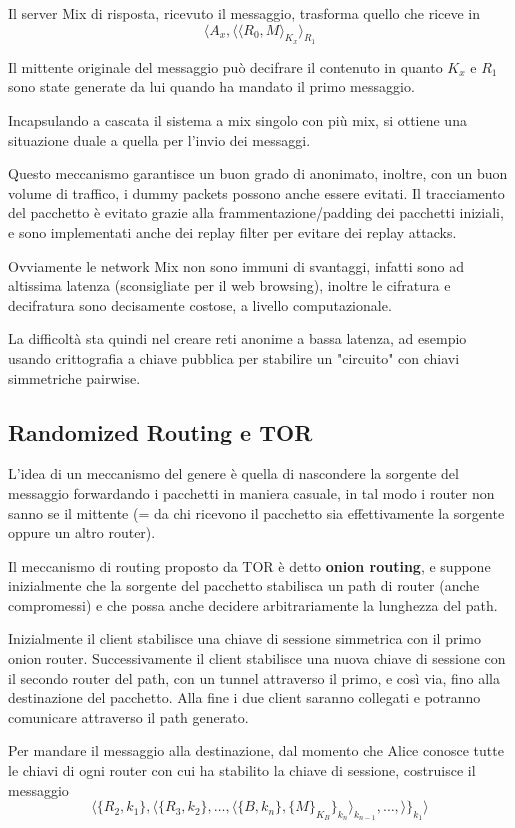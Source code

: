 \documentclass[a4paper, 10pt, twoside]{article}
\begin{document}
	Il server Mix di risposta, ricevuto il messaggio, trasforma quello che riceve in \[\langle A_x,\langle\langle R_0, M\rangle_{K_x}\rangle_{R_1}\]

	Il mittente originale del messaggio può decifrare il contenuto in quanto $K_x$ e $R_1$ sono state generate da lui quando ha mandato il primo messaggio.

	Incapsulando a cascata il sistema a mix singolo con più mix, si ottiene una situazione duale a quella per l'invio dei messaggi.

	Questo meccanismo garantisce un buon grado di anonimato, inoltre, con un buon volume di traffico, i dummy packets possono anche essere evitati. Il tracciamento del pacchetto è evitato grazie alla frammentazione/padding dei pacchetti iniziali, e sono implementati anche dei replay filter per evitare dei replay attacks.

	Ovviamente le network Mix non sono immuni di svantaggi, infatti sono ad altissima latenza (sconsigliate per il web browsing), inoltre le cifratura e decifratura sono decisamente costose, a livello computazionale.

	La difficoltà sta quindi nel creare reti anonime a bassa latenza, ad esempio usando crittografia a chiave pubblica per stabilire un "circuito" con chiavi simmetriche pairwise.

	\subsection{Randomized Routing e TOR}
	L'idea di un meccanismo del genere è quella di nascondere la sorgente del messaggio forwardando i pacchetti in maniera casuale, in tal modo i router non sanno se il mittente (= da chi ricevono il pacchetto sia effettivamente la sorgente oppure un altro router).

	Il meccanismo di routing proposto da TOR è detto \textbf{onion routing}, e suppone inizialmente che la sorgente del pacchetto stabilisca un path di router (anche compromessi) e che possa anche decidere arbitrariamente la lunghezza del path.

	Inizialmente il client stabilisce una chiave di sessione simmetrica con il primo onion router.
	Successivamente il client stabilisce una nuova chiave di sessione con il secondo router del path, con un tunnel attraverso il primo, e così via, fino alla destinazione del pacchetto. Alla fine i due client saranno collegati e potranno comunicare attraverso il path generato.

	Per mandare il messaggio alla destinazione, dal momento che Alice conosce tutte le chiavi di ogni router con cui ha stabilito la chiave di sessione, costruisce il messaggio \[ \langle \lbrace R_2, k_1\rbrace , \langle\lbrace R_3, k_2\rbrace, \dots, \langle\lbrace B, k_n\rbrace,\lbrace M\rbrace_{K_B}\rbrace_{k_n}\rangle_{k_{n-1}}, \dots,\rangle \rbrace_{k_1}\rangle \]
\end{document}
